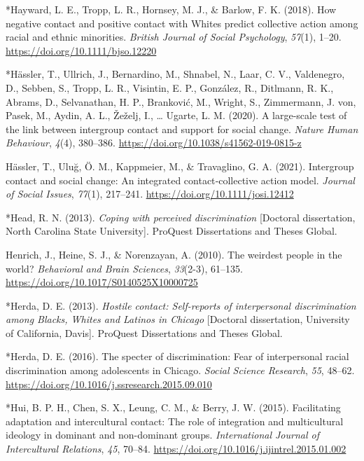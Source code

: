 \documentclass[12pt, letterpaper]{article}
\begin{document}
\leavevmode\hypertarget{ref-2309}{}%
*Hayward, L. E., Tropp, L. R., Hornsey, M. J., \& Barlow, F. K. (2018).
How negative contact and positive contact with Whites predict collective
action among racial and ethnic minorities. \emph{British Journal of
Social Psychology}, \emph{57}(1), 1--20.
\url{https://doi.org/10.1111/bjso.12220}

\leavevmode\hypertarget{ref-3054}{}%
*Hässler, T., Ullrich, J., Bernardino, M., Shnabel, N., Laar, C. V.,
Valdenegro, D., Sebben, S., Tropp, L. R., Visintin, E. P., González, R.,
Ditlmann, R. K., Abrams, D., Selvanathan, H. P., Branković, M., Wright,
S., Zimmermann, J. von, Pasek, M., Aydin, A. L., Žeželj, I., \ldots{}
Ugarte, L. M. (2020). A large-scale test of the link between intergroup
contact and support for social change. \emph{Nature Human Behaviour},
\emph{4}(4), 380--386. \url{https://doi.org/10.1038/s41562-019-0815-z}

\leavevmode\hypertarget{ref-hassler_intergroup_2021}{}%
Hässler, T., Uluğ, Ö. M., Kappmeier, M., \& Travaglino, G. A. (2021).
Intergroup contact and social change: An integrated contact‐collective
action model. \emph{Journal of Social Issues}, \emph{77}(1), 217--241.
\url{https://doi.org/10.1111/josi.12412}

\leavevmode\hypertarget{ref-1407}{}%
*Head, R. N. (2013). \emph{Coping with perceived discrimination}
{[}Doctoral dissertation, North Carolina State University{]}. ProQuest
Dissertations and Theses Global.

\leavevmode\hypertarget{ref-henrich_weirdest_2010}{}%
Henrich, J., Heine, S. J., \& Norenzayan, A. (2010). The weirdest people
in the world? \emph{Behavioral and Brain Sciences}, \emph{33}(2-3),
61--135. \url{https://doi.org/10.1017/S0140525X10000725}

\leavevmode\hypertarget{ref-1494}{}%
*Herda, D. E. (2013). \emph{Hostile contact: Self-reports of
interpersonal discrimination among Blacks, Whites and Latinos in
Chicago} {[}Doctoral dissertation, University of California, Davis{]}.
ProQuest Dissertations and Theses Global.

\leavevmode\hypertarget{ref-324}{}%
*Herda, D. E. (2016). The specter of discrimination: Fear of
interpersonal racial discrimination among adolescents in Chicago.
\emph{Social Science Research}, \emph{55}, 48--62.
\url{https://doi.org/10.1016/j.ssresearch.2015.09.010}

\leavevmode\hypertarget{ref-609}{}%
*Hui, B. P. H., Chen, S. X., Leung, C. M., \& Berry, J. W. (2015).
Facilitating adaptation and intercultural contact: The role of
integration and multicultural ideology in dominant and non-dominant
groups. \emph{International Journal of Intercultural Relations},
\emph{45}, 70--84. \url{https://doi.org/10.1016/j.ijintrel.2015.01.002}
\end{document}
